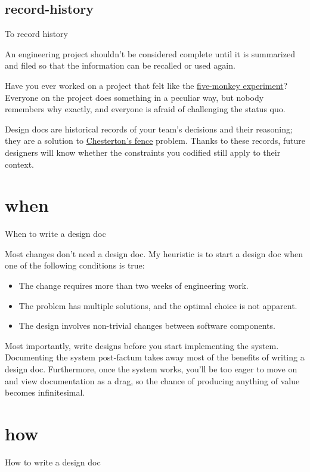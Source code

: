\documentclass{article}
\begin{document}
\subsection{record-history}{To record history}
\epigraph{
An engineering project shouldn't be considered complete until it is summarized and filed so that the information can be recalled or used again.  
}{}

Have you ever worked on a project that felt like the \href{https://skeptics.stackexchange.com/questions/6828/was-the-experiment-with-five-monkeys-a-ladder-a-banana-and-a-water-spray-condu#6859}{five-monkey experiment}?
Everyone on the project does something in a peculiar way, but nobody remembers why exactly, and everyone is afraid of challenging the status quo.

Design docs are historical records of your team's decisions and their reasoning; they are a solution to \href{https://fs.blog/chestertons-fence/}{Chesterton's fence} problem.
Thanks to these records, future designers will know whether the constraints you codified still apply to their context.

\section{when}{When to write a design doc}

Most changes don't need a design doc.
My heuristic is to start a design doc when one of the following conditions is true:
\begin{itemize}
\item The change requires more than two weeks of engineering work.
\item The problem has multiple solutions, and the optimal choice is not apparent.
\item The design involves non-trivial changes between software components.
\end{itemize}

Most importantly, write designs before you start implementing the system.
Documenting the system post-factum takes away most of the benefits of writing a design doc.
Furthermore, once the system works, you'll be too eager to move on and view documentation as a drag, so the chance of producing anything of value becomes infinitesimal.

\section{how}{How to write a design doc}
\end{document}

